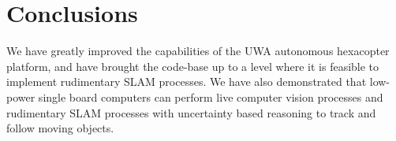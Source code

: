 \documentclass[a4paper, 11pt, titlepage]{article}
\begin{document}
\section{Conclusions}
  We have greatly improved the capabilities of the UWA autonomous hexacopter platform, and have brought the code-base up to a level where it is feasible to implement rudimentary SLAM processes.
  We have also demonstrated that low-power single board computers can perform live computer vision processes and rudimentary SLAM processes with uncertainty based reasoning to track and follow moving objects.






\renewcommand{\refname}{References}


%


\begin{appendices}
%    

\end{appendices}

  
\end{document}
